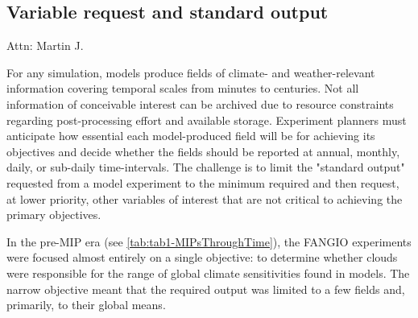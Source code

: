 \documentclass[gmd, preprint]{copernicus}
\newcommand{\mycomment}[1]{}
\def\cred#1{{\color{red}#1}}
\begin{document}
\subsection{Variable request and standard output}
\label{sec:CMIP6DR}
\cred{Attn: Martin J.}
\mycomment{Consider realm/frequency evolution across mip eras. RE: realm evolution, started in CMIP3 with tables (A1, O1, etc), built around the history files, from model components - so all ocean history files contained ocean, and sea ice variable, etc - Karl to augment; RE: frequencies, 3D fields, vs 2D fields were separated across tables as these had different temporal requests, to keep request sizes down; \autoref{tab:tab1-MIPsThroughTime} and \autoref{tab:tabAppB1-MIPStandardOutput}

Old: A critical component MIP experimentation is specifying what simulation output to save. It is a trade off between the efforts required by modelling groups to fulfill a request, available storage, and existing and potential future science needs. Despite advancing technology, saving everything (i.e., all prognostic variables at every timestep) has never been realistic. In AMIP1/2, CMIP1/2/2+/3/5, consideration, was made in consultation with MIP chairs and modelling groups about what questions or analyses will be pursued with a given simulation that dictates how much data is saved.

As MIPs emerged, more scientists began analyzing simulations, and it was not always clear a priori what would be studied.
}

For any simulation, models produce fields of climate- and weather-relevant information covering temporal scales from minutes to centuries. Not all information of conceivable interest can be archived due to resource constraints regarding post-processing effort and available storage. Experiment planners must anticipate how essential each model-produced field will be for achieving its objectives and decide whether the fields should be reported at annual, monthly, daily, or sub-daily time-intervals. The challenge is to limit the "standard output" requested from a model experiment to the minimum required and then request, at lower priority, other variables of interest that are not critical to achieving the primary objectives.

In the pre-MIP era (see \autoref{tab:tab1-MIPsThroughTime}), the FANGIO experiments were focused almost entirely on a single objective: to determine whether clouds were responsible for the range of global climate sensitivities found in models. The narrow objective meant that the required output was limited to a few fields and, primarily, to their global means.
\end{document}

